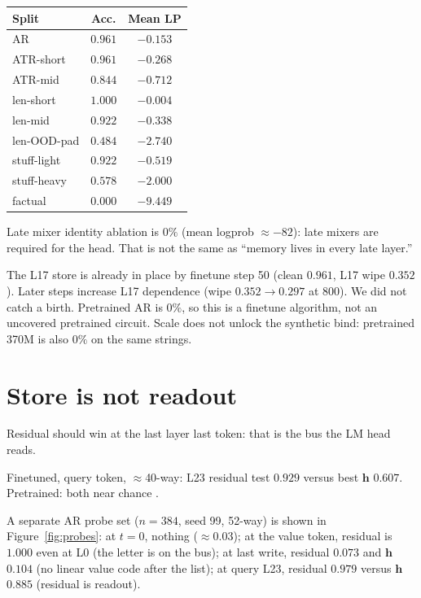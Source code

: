 \documentclass[11pt]{article}
\begin{document}
\begin{center}
\small
\begin{tabular}{@{}lcc@{}}
\toprule
Split & Acc. & Mean LP \\
\midrule
AR & $0.961$ & $-0.153$ \\
ATR-short & $0.961$ & $-0.268$ \\
ATR-mid & $0.844$ & $-0.712$ \\
len-short & $1.000$ & $-0.004$ \\
len-mid & $0.922$ & $-0.338$ \\
len-OOD-pad & $0.484$ & $-2.740$ \\
stuff-light & $0.922$ & $-0.519$ \\
stuff-heavy & $0.578$ & $-2.000$ \\
factual & $0.000$ & $-9.449$ \\
\bottomrule
\end{tabular}
\end{center}

Late mixer identity ablation is $0\%$ (mean logprob $\approx -82$): late
mixers are required for the head.
That is not the same as ``memory lives in every late layer.''

The L17 store is already in place by finetune step 50 (clean $0.961$,
L17 wipe $0.352$).
Later steps increase L17 dependence (wipe $0.352 \to 0.297$ at 800).
We did not catch a birth.
Pretrained AR is $0\%$, so this is a finetune algorithm, not an uncovered
pretrained circuit.
Scale does not unlock the synthetic bind: pretrained 370M is also $0\%$
on the same strings.

\section{Store is not readout}

Residual should win at the last layer last token: that is the bus the LM
head reads.

Finetuned, query token, $\approx$40-way: L23 residual test $0.929$ versus
best $\mathbf{h}$ $0.607$.
Pretrained: both near chance \cite{wagh2026}.

A separate AR probe set ($n=384$, seed 99, 52-way) is shown in
Figure~\ref{fig:probes}:
at $t=0$, nothing ($\approx 0.03$);
at the value token, residual is $1.000$ even at L0 (the letter is on the
bus);
at last write, residual $0.073$ and $\mathbf{h}$ $0.104$ (no linear value
code after the list);
at query L23, residual $0.979$ versus $\mathbf{h}$ $0.885$ (residual is
readout).
\end{document}
